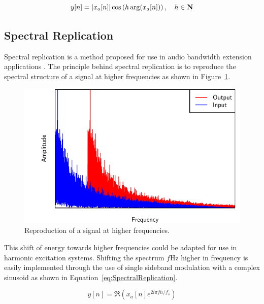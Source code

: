 		\begin{equation}
			y[n] = \left|x_{a}[n]\right| \cos \left( h\arg(x_{a}[n]) \right), \quad h \in \textbf{N}
			\label{eq:IAP}
		\end{equation}

	\subsection{Spectral Replication}
	\label{sec:Excitation-Methods-SpectralReplication}
		Spectral replication is a method proposed for use in audio bandwidth extension applications
		\citep{nagel2010a}. The principle behind spectral replication is to reproduce the spectral structure of a
		signal at higher frequencies as shown in Figure~\ref{fig:SpectralReplication}.

		\begin{figure}[h!]
			\centering
			\includegraphics{chapter3/Images/SpectralReplicationSpectrum.pdf}
			\caption{Reproduction of a signal at higher frequencies.}
			\label{fig:SpectralReplication}
		\end{figure}

		This shift of energy towards higher frequencies could be adapted for use in harmonic excitation systems.
		Shifting the spectrum $f$Hz higher in frequency is easily implemented through the use of single sideband
		modulation with a complex sinusoid as shown in Equation~\ref{eq:SpectralReplication}.

		\begin{equation}
			y[n] = \Re \left( x_{a}[n] e^{2i\pi fn/ f_{s}} \right)
			\label{eq:SpectralReplication}
		\end{equation}

